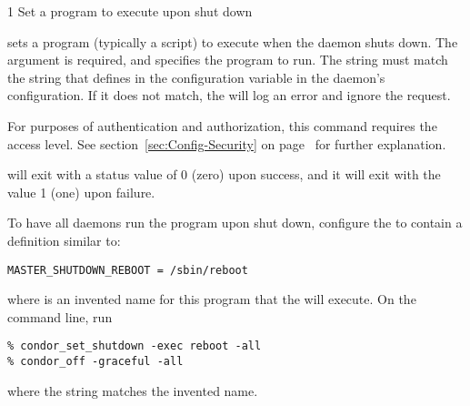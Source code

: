 \begin{ManPage}{\label{man-condor-set-shutdown}}{1}
{Set a program to execute upon  shut down}
\Synopsis {}
\ToolArgsBase

\ToolDebugOption
\ToolArgsLocate

\ToolDebugOption
\ToolWhere


\Description 

 sets a program (typically a script) to execute
when the  daemon shuts down.
The  argument is required,
and specifies the program to run.  
The string  must match the
string that defines  in the configuration variable
 in the  daemon's
configuration. 
If it does not match, the  will log an error and ignore the
request.

For purposes of authentication and authorization,
this command requires the  access level.
See
section~\ref{sec:Config-Security} on page~\pageref{sec:Config-Security}
for further explanation.

\begin{Options}
  \ToolArgsBaseDesc
  \ToolDebugDesc
  \ToolArgsLocateDesc
\end{Options}

\ExitStatus
{} will exit with a status value of 0 (zero) upon
success, and it will exit with the value 1 (one) upon failure.


\Examples
To have all  daemons run the program
 upon shut down, configure the  
to contain a definition similar to:
\begin{verbatim}
MASTER_SHUTDOWN_REBOOT = /sbin/reboot
\end{verbatim}
where  is an invented name for this program that
the  will execute.
On the command line, run
\begin{verbatim}
% condor_set_shutdown -exec reboot -all
% condor_off -graceful -all
\end{verbatim}
where the string \verb@reboot@ matches the invented name.

\end{ManPage}
